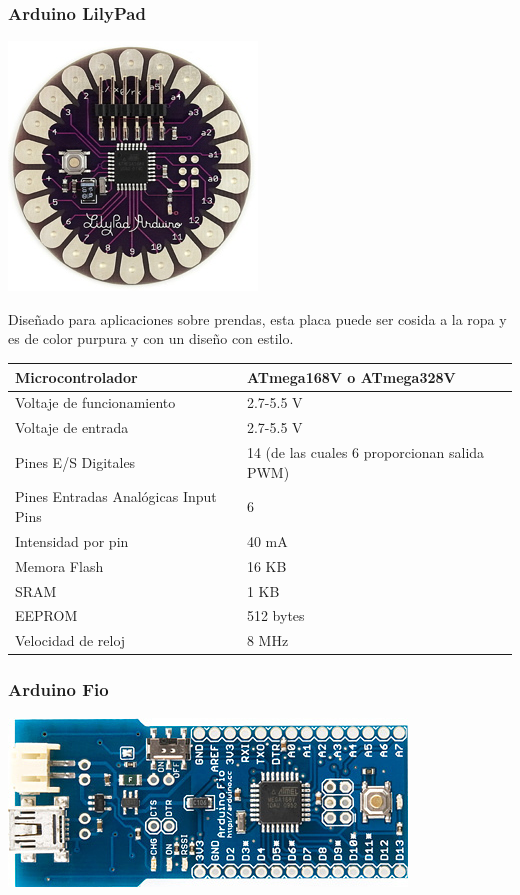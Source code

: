 \documentclass[12pt,a4paper]{report}
\begin{document}
\subsubsection{Arduino LilyPad}

\includegraphics[scale=0.6]{LilyPad_3.jpg}

Diseñado para aplicaciones sobre prendas, esta placa puede ser cosida a la ropa
y es de color purpura y con un diseño con estilo. 

\begin{tabular}{||l | l ||}
\hline
\hline
Microcontrolador & ATmega168V o ATmega328V\\
\hline
Voltaje de funcionamiento & 2.7-5.5 V\\
\hline
Voltaje de entrada & 2.7-5.5 V\\
\hline
Pines E/S Digitales & 14 (de las cuales 6 proporcionan salida PWM)\\
\hline
Pines Entradas Analógicas Input Pins & 6\\
\hline
Intensidad por pin & 40 mA\\
\hline
Memora Flash & 16 KB \\
\hline
SRAM & 1 KB\\
\hline
EEPROM & 512 bytes\\
\hline
Velocidad de reloj & 8 MHz\\
\hline
\hline
\end{tabular}


\subsubsection{Arduino Fio}

\includegraphics[scale=0.6]{ArduinoFio.jpg}
\end{document}
